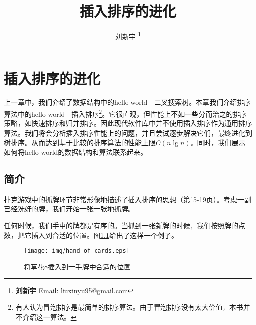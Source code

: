 \documentclass[UTF8]{article}
\begin{document}


\title{插入排序的进化}

\author{刘新宇
\thanks{{\bfseries 刘新宇} \newline
  Email: liuxinyu95@gmail.com \newline}
  }

\maketitle
\fi


\ifx\wholebook\relax
\chapter{插入排序的进化}
\fi

上一章中，我们介绍了数据结构中的hello world—二叉搜索树。本章我们介绍排序算法中的hello world—插入排序\footnote{有人认为冒泡排序是最简单的排序算法。由于冒泡排序没有太大价值，本书并不介绍这一算法\cite{wiki-bubble-sort}。}。它很直观，但性能上不如一些分而治之的排序策略，如快速排序和归并排序。因此现代软件库中并不使用插入排序作为通用排序算法。我们将会分析插入排序性能上的问题，并且尝试逐步解决它们，最终进化到树排序。从而达到基于比较的排序算法的性能上限$O(n \lg n)$。同时，我们展示如何将hello world的数据结构和算法联系起来。

\section{简介}
\label{introduction} 
扑克游戏中的抓牌环节非常形像地描述了插入排序的思想（\cite{CLRS}第15-19页）。考虑一副已经洗好的牌，我们开始一张一张地抓牌。

任何时候，我们手中的牌都是有序的。当抓到一张新牌的时候，我们按照牌的点数，把它插入到合适的位置。图\ref{fig:hand-of-cards}给出了这样一个例子。

\begin{figure}[htbp]
  \centering
  \texttt{[image: img/hand-of-cards.eps]}
  \caption{将草花8插入到一手牌中合适的位置}
  \label{fig:hand-of-cards}
\end{figure}
\end{document}
